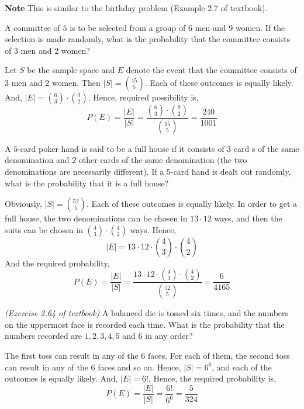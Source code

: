\textbf{Note} This is similar to the birthday problem (Example 2.7 of
textbook).

\begin{example}
    A committee of $5$ is to be selected from a group of $6$ men and $9$ women.
If the selection is made randomly, what is the probability that the committee
consists of $3$ men and $2$ women?
\end{example}
\begin{solution}
    Let $S$ be the sample space and $E$ denote the event that the committee
consists of $3$ men and $2$ women. Then $\vert S \vert = {15 \choose 5}$. Each
of these outcomes is equally likely. And, $\vert E \vert = {6 \choose 3} \cdot
{9 \choose 2}$. Hence, required possibility is, 
\begin{equation*}
    P(E) = \frac{\vert E \vert}{\vert S \vert}
         = \frac{{6 \choose 3} \cdot {9 \choose 2}}{{15 \choose 5}}
         = \frac{240}{1001}
\end{equation*}
\end{solution}

\begin{example}
    A $5$-card poker hand is said to be a full house if it consists of $3$ card
s of the same denomination and $2$ other cards of the same denomination (the
two denominations are necessarily different). If a $5$-card hand is dealt out
randomly, what is the probability that it is a full house?
\end{example}
\begin{solution}
    Obviously, $\vert S \vert = {52 \choose 5}$. Each of these outcomes is
equally likely. In order to get a full house, the two denominations can be
chosen in $13 \cdot 12$ ways, and then the suits can be chosen in ${4 \choose
3} \cdot {4 \choose 2}$ ways. Hence,
\begin{equation*}
    \vert E \vert = 13 \cdot 12 \cdot {4 \choose 3} \cdot {4 \choose 2}
\end{equation*}
And the required probability, 
\begin{equation*}
    P(E) = \frac{\vert E \vert}{\vert S \vert}
         = \frac{13 \cdot 12 \cdot {4 \choose 3} \cdot {4 \choose 2}}{{52
           \choose 5}}
         = \frac{6}{4165}
\end{equation*}
\end{solution}

\begin{example}
    \emph{(Exercise 2.64 of textbook)} A balanced die is tossed six times, and
the numbers on the uppermost face is recorded each time. What is the
probability that the numbers recorded are $1, 2, 3, 4, 5$ and $6$ in any order?
\end{example}
\begin{solution}
    The first toss can result in any of the $6$ faces. For each of them, the
second toss can result in any of the $6$ faces and so on. Hence, $\vert S
\vert = 6^6$, and each of the outcomes is equally likely. And, $\vert E \vert
= 6!$. Hence, the required probability is, 
\begin{equation*}
    P(E) = \frac{\vert E \vert}{\vert S \vert} 
         = \frac{6!}{6^6} 
         = \frac{5}{324}
\end{equation*}
\end{solution}